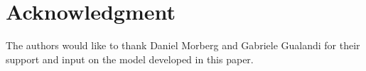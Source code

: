 \section*{Acknowledgment}

The authors would like to thank Daniel Morberg and Gabriele Gualandi for their support and input on the model developed in this paper.

